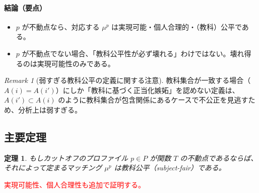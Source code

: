 \documentclass[12pt, a4paper]{article}
\theoremstyle{definition}
\theoremstyle{remark}
\newtheorem{remark}{Remark}
\theoremstyle{plain}
\newtheorem{theorem}{定理}
\begin{document}
\paragraph{結論（要点）}
\begin{itemize}
  \item $p$ が不動点なら、対応する $\mu^p$ は実現可能・個人合理的・（教科）公平である。
  \item $p$ が不動点でない場合、「教科公平性が必ず壊れる」わけではない。壊れ得るのは実現可能性のみである。
\end{itemize}

\begin{remark}[弱すぎる教科公平の定義に関する注意]
教科集合が一致する場合（$A(i)=A(i')$）にしか「教科に基づく正当化嫉妬」を認めない定義は、$A(i')\subset A(i)$ のように教科集合が包含関係にあるケースで不公正を見逃すため、分析上は弱すぎる。
\end{remark}



\subsection{主要定理}




\begin{theorem}
もしカットオフのプロファイル \( p \in P\) が関数 \( T \) の不動点であるならば、それによって定まるマッチング \( \mu^{p} \) は教科公平（subject-fair）である。
\end{theorem}

\textcolor{red}{実現可能性、個人合理性も追加で証明する。}
\end{document}

